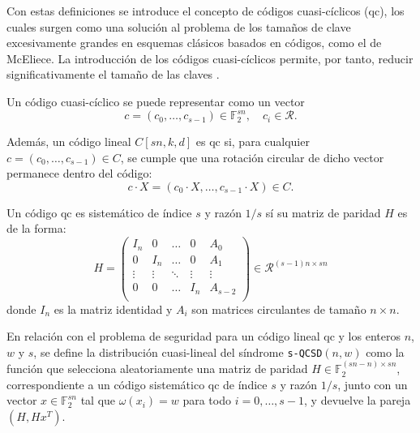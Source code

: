 Con estas definiciones se introduce el concepto de códigos cuasi-cíclicos (\acrshort{qc}), los cuales surgen como una solución al problema de los tamaños de clave excesivamente grandes en esquemas clásicos basados en códigos, como el de McEliece. La introducción de los códigos cuasi-cíclicos permite, por tanto, reducir significativamente el tamaño de las claves \cite{Gaborit2005ShorterKF}.  
\newline

Un código cuasi-cíclico se puede representar como un vector 
\begin{equation}
c = (c_0, \hdots, c_{s-1}) \in \mathbb{F}_2^{sn}, \quad c_i \in \mathcal{R}.
\end{equation} 

Además, un código lineal \(C[sn,k,d]\) es \acrshort{qc} si, para cualquier \(c = (c_0, \hdots, c_{s-1}) \in C\), se cumple que una rotación circular de dicho vector permanece dentro del código:
\begin{equation}
	c \cdot X = (c_0 \cdot X, \hdots, c_{s-1} \cdot X) \in C.
\end{equation}

Un código \acrshort{qc} es sistemático de índice \(s\) y razón \(1/s\) sí su matriz de paridad \(H\) es de la forma:
\begin{equation}
	H=\begin{pmatrix}
		I_n &0&\hdots&0&A_0\\
		0 &I_n&\hdots&0&A_1\\
		\vdots &\vdots&\ddots&\vdots&\vdots\\
		0 &0&\hdots&I_n&A_{s-2}\\
	\end{pmatrix}\in \mathcal{R}^{(s-1)n\times sn}
\end{equation}
donde \(I_n\) es la matriz identidad y \(A_i\) son matrices circulantes de tamaño \(n\times n\).
\newline

En relación con el problema de seguridad para un código lineal \acrshort{qc} y los enteros \(n\), \(w\) y \(s\), se define la distribución cuasi-lineal del síndrome \texttt{s-QCSD}\((n,w)\) como la función que selecciona aleatoriamente una matriz de paridad \(H \in \mathbb{F}_2^{(sn-n)\times sn}\), correspondiente a un código sistemático \acrshort{qc} de índice \(s\) y razón \(1/s\), junto con un vector \(x \in \mathbb{F}_2^{sn}\) tal que \(\omega(x_i) = w\) para todo \(i=0,\ldots,s-1\), y devuelve la pareja \((H, Hx^T)\).
\newline

